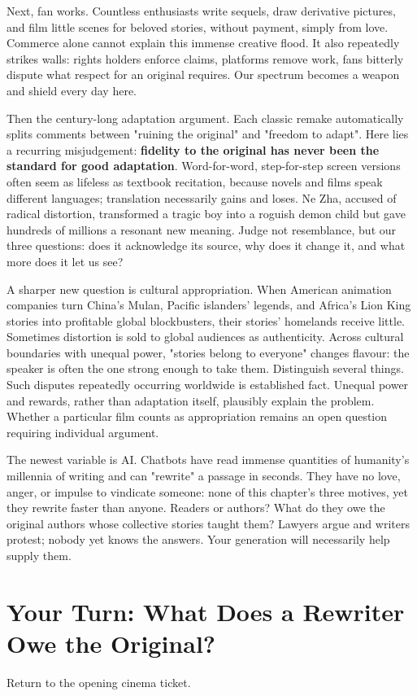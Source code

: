 Next, fan works. Countless enthusiasts write sequels, draw derivative pictures, and film little scenes for beloved stories, without payment, simply from love. Commerce alone cannot explain this immense creative flood. It also repeatedly strikes walls: rights holders enforce claims, platforms remove work, fans bitterly dispute what respect for an original requires. Our spectrum becomes a weapon and shield every day here.

Then the century-long adaptation argument. Each classic remake automatically splits comments between "ruining the original" and "freedom to adapt". Here lies a recurring misjudgement: \textbf{fidelity to the original has never been the standard for good adaptation}. Word-for-word, step-for-step screen versions often seem as lifeless as textbook recitation, because novels and films speak different languages; translation necessarily gains and loses. Ne Zha, accused of radical distortion, transformed a tragic boy into a roguish demon child but gave hundreds of millions a resonant new meaning. Judge not resemblance, but our three questions: does it acknowledge its source, why does it change it, and what more does it let us see?

A sharper new question is cultural appropriation. When American animation companies turn China's Mulan, Pacific islanders' legends, and Africa's Lion King stories into profitable global blockbusters, their stories' homelands receive little. Sometimes distortion is sold to global audiences as authenticity. Across cultural boundaries with unequal power, "stories belong to everyone" changes flavour: the speaker is often the one strong enough to take them. Distinguish several things. Such disputes repeatedly occurring worldwide is established fact. Unequal power and rewards, rather than adaptation itself, plausibly explain the problem. Whether a particular film counts as appropriation remains an open question requiring individual argument.

The newest variable is AI. Chatbots have read immense quantities of humanity's millennia of writing and can "rewrite" a passage in seconds. They have no love, anger, or impulse to vindicate someone: none of this chapter's three motives, yet they rewrite faster than anyone. Readers or authors? What do they owe the original authors whose collective stories taught them? Lawyers argue and writers protest; nobody yet knows the answers. Your generation will necessarily help supply them.

\section[Your Turn: What Does a Rewriter Owe?]{Your Turn: What Does a Rewriter Owe the Original?}
Return to the opening cinema ticket.

